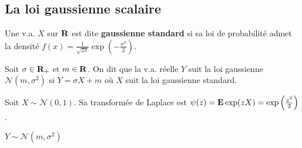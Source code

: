 \subsection{La loi gaussienne scalaire}

	\begin{defn}
		Une v.a. $X$ sur $\mathbf{R}$ est dite \textbf{gaussienne standard} si sa loi de probabilité admet la densité $f(x) = \frac{1}{\sqrt{2 \pi}} \exp \left( - \frac{x^2}{2} \right)$.
	\end{defn}
	
	\begin{defn}
		Soit $\sigma \in \mathbf{R}_+$ et $m \in \mathbf{R}$.
		On dit que la v.a. réelle $Y$ suit la loi gaussienne $\mathcal{N}(m,\sigma^2)$ si $Y = \sigma X + m$ où $X$ suit la loi gaussienne standard.
	\end{defn}
	
	\begin{pop}
		Soit $X \sim \mathcal{N}(0,1)$.
		Sa transformée de Laplace est $\psi(z) = \mathbf{E} \exp(zX) = \exp \left( \frac{z^2}{2} \right)$.
	\end{pop}
	
	\begin{pop}
		$Y \sim \mathcal{N}(m,\sigma^2)$ 
	\end{pop}